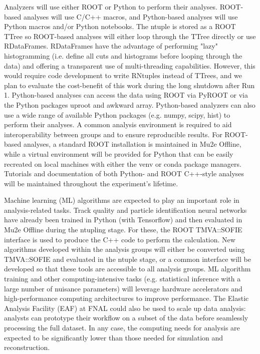 Analyzers will use either ROOT or Python to perform their analyses. ROOT-based analyses will use C/C++ macros, and Python-based analyses will use Python macros and/or Python notebooks. The ntuple is stored as a ROOT TTree so ROOT-based analyses will either loop through the TTree directly or use RDataFrames. RDataFrames have the advantage of performing "lazy" histogramming (i.e. define all cuts and histograms before looping through the data) and offering a transparent use of multi-threading capabilities. However, this would require code development to write RNtuples instead of TTrees, and we plan to evaluate the cost-benefit of this work during the long shutdown after Run 1. Python-based analyses can access the data using ROOT via PyROOT or via the Python packages uproot and awkward array. Python-based analyzers can also use a wide range of available Python packages (e.g. numpy, scipy, hist) to perform their analyses. A common analysis environment is required to aid interoperability between groups and to ensure reproducible results. For ROOT-based analyses, a standard ROOT installation is maintained in Mu2e Offline, while a virtual environment will be provided for Python that can be easily recreated on local machines with either the venv or conda package managers. Tutorials and documentation of both Python- and ROOT C++-style analyses will be maintained throughout the experiment's lifetime. 

Machine learning (ML) algorithms are expected to play an important role in analysis-related tasks. Track quality and particle identification neural networks have already been trained in Python (with Tensorflow) and then evaluated in Mu2e Offline during the ntupling stage. For these, the ROOT TMVA::SOFIE interface is used to produce the C++ code to perform the calculation. New algorithms developed within the analysis groups will either be converted using TMVA::SOFIE and evaluated in the ntuple stage, or a common interface will be developed so that these tools are accessible to all analysis groups. ML algorithm training and other computing-intensive tasks (e.g. statistical inference with a large number of nuisance parameters) will leverage hardware accelerators and high-performance computing architectures to improve performance. The Elastic Analysis Facility (EAF) at FNAL could also be used to scale up data analysis: analysts can prototype their workflow on a subset of the data before seamlessly processing the full dataset. In any case, the computing needs for analysis are expected to be significantly lower than those needed for simulation and reconstruction.


